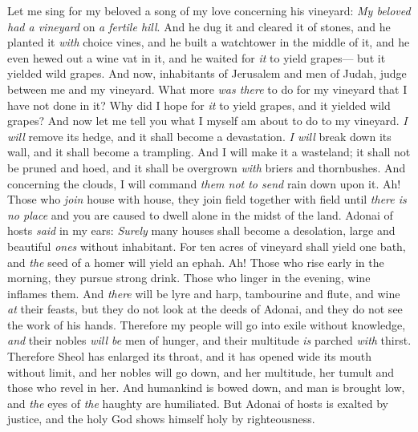 \begin{biblechapter} %
 Let me sing for my beloved 
a song of my love concerning his vineyard: 
\textit{My beloved had a vineyard} on \textit{a fertile hill}.
\verse And he dug it and cleared it of stones, 
and he planted it \textit{with} choice vines, 
and he built a watchtower in the middle of it, 
and he even hewed out a wine vat in it, 
and he waited for \textit{it} to yield grapes— 
but it yielded wild grapes.
\verse And now, inhabitants of Jerusalem 
and men of Judah, judge between me and my vineyard.
\verse What more \textit{was there} to do for my vineyard that I have not done in it? 
Why did I hope for \textit{it} to yield grapes, and it yielded wild grapes?
\verse And now let me tell you what I myself am about to do to my vineyard.
\verse \textit{I will} remove its hedge, and it shall become a devastation. 
\textit{I will} break down its wall, and it shall become a trampling.
\verse And I will make it a wasteland; 
it shall not be pruned and hoed, 
and it shall be overgrown \textit{with} briers and thornbushes. 
And concerning the clouds, I will command \textit{them not to send} rain down upon it.
 Ah! Those who \textit{join} house with house, 
they join field together with field 
until \textit{there is no place} 
and you are caused to dwell alone in the midst of the land.
\verse Adonai of hosts \textit{said} in my ears:
\verse \textit{Surely} many houses shall become a desolation, 
large and beautiful \textit{ones} without inhabitant.
\verse For ten acres of vineyard shall yield one bath, 
and \textit{the} seed of a homer will yield an ephah.
\verse Ah! Those who rise early in the morning, 
they pursue strong drink. 
Those who linger in the evening, 
wine inflames them.
\verse And \textit{there} will be lyre and harp, 
tambourine and flute, 
and wine \textit{at} their feasts, 
but they do not look at the deeds of Adonai, 
and they do not see the work of his hands.
\verse Therefore my people will go into exile without knowledge, 
\textit{and} their nobles \textit{will be} men of hunger, 
and their multitude \textit{is} parched \textit{with} thirst.
\verse Therefore Sheol has enlarged its throat, 
and it has opened wide its mouth without limit, 
and her nobles will go down, and her multitude, 
her tumult and those who revel in her.
\verse And humankind is bowed down, 
and man is brought low, 
and \textit{the} eyes of \textit{the} haughty are humiliated.
\verse But Adonai of hosts is exalted by justice, 
and the holy God shows himself holy by righteousness.

\end{biblechapter}
